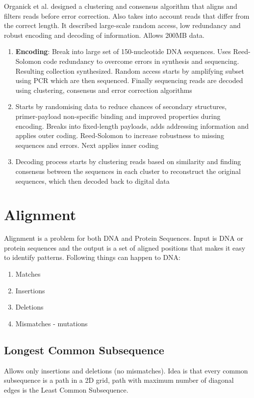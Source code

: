 \documentclass{article}
\begin{document}
Organick et al. designed a clustering and consensus algorithm that aligns and filters reads before error correction. Also takes into account reads that differ from the correct length. It described large-scale random access, low redundancy and robust encoding and decoding of information. Allows 200MB data. 
\begin{enumerate}
    \item \textbf{Encoding}: Break into large set of 150-nucleotide DNA sequences. Uses Reed-Solomon code redundancy to overcome errors in synthesis and sequencing. Resulting collection synthesized. Random access starts by amplifying subset using PCR which are then sequenced. Finally sequencing reads are decoded using clustering, consensus and error correction algorithms
    \item Starts by randomising data to reduce chances of secondary structures, primer-payload non-specific binding and improved properties during encoding. Breaks into fixed-length payloads, adds addressing information and applies outer coding. Reed-Solomon to increase robustness to missing sequences and errors. Next applies inner coding 
    \item Decoding process starts by clustering reads based on similarity and finding consensus between the sequences in each cluster to reconstruct the original sequences, which then decoded back to digital data
    
\end{enumerate}


\section{Alignment}
Alignment is a problem for both DNA and Protein Sequences. Input is DNA or protein sequences and the output is a set of aligned positions that makes it easy to identify patterns. Following things can happen to DNA:
\begin{enumerate}
    \item Matches
    \item Insertions
    \item Deletions
    \item Mismatches - mutations
\end{enumerate}

\subsection{Longest Common Subsequence}
Allows only insertions and deletions (no mismatches). Idea is that every common subsequence is a path in a 2D grid, path with maximum number of diagonal edges is the Least Common Subsequence.
\end{document}
